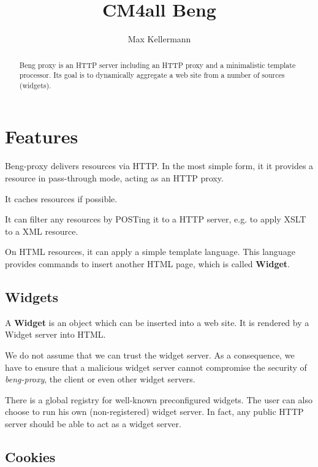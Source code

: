 \documentclass[a4paper,12pt]{article}
\begin{document}
\title{CM4all Beng}
\author{Max Kellermann}

\maketitle

\begin{abstract}
Beng proxy is an HTTP server including an HTTP proxy and a
minimalistic template processor.  Its goal is to dynamically aggregate
a web site from a number of sources (widgets).
\end{abstract}

\setcounter{tocdepth}{2}
\tableofcontents
\newpage

\section{Features}

Beng-proxy delivers resources via HTTP.  In the most simple form, it
it provides a resource in pass-through mode, acting as an HTTP proxy.

It caches resources if possible.

It can filter any resources by POSTing it to a HTTP server,
e.g. to apply XSLT to a XML resource.

On HTML resources, it can apply a simple template language.  This
language provides commands to insert another HTML page, which is
called \textbf{Widget}.

\subsection{Widgets}

A \textbf{Widget} is an object which can be inserted into a web site.
It is rendered by a Widget server into HTML.

We do not assume that we can trust the widget server.  As a
consequence, we have to ensure that a malicious widget server cannot
compromise the security of \emph{beng-proxy}, the client or even other
widget servers.

There is a global registry for well-known preconfigured widgets.  The
user can also choose to run his own (non-registered) widget server.
In fact, any public HTTP server should be able to act as a widget
server.


\subsection{Cookies}
\end{document}
